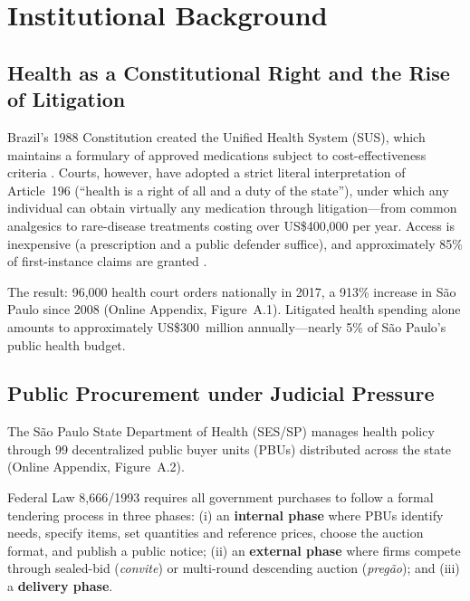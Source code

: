 \section{Institutional Background}
\label{sec:institutional}

\subsection{Health as a Constitutional Right and the Rise of Litigation}
\label{sec:health_right}

Brazil's 1988 Constitution created the Unified Health System (SUS), which maintains a formulary of approved medications subject to cost-effectiveness criteria \citep{castro2019, soares2019}. Courts, however, have adopted a strict literal interpretation of Article~196 (``health is a right of all and a duty of the state''), under which any individual can obtain virtually any medication through litigation---from common analgesics to rare-disease treatments costing over US\$400,000 per year. Access is inexpensive (a prescription and a public defender suffice), and approximately 85\% of first-instance claims are granted \citep{cnj2019judicializacao}.

The result: 96,000 health court orders nationally in 2017, a 913\% increase in S\~ao Paulo since 2008 (Online Appendix, Figure~A.1). Litigated health spending alone amounts to approximately US\$300~million annually---nearly 5\% of S\~ao Paulo's public health budget.

\subsection{Public Procurement under Judicial Pressure}
\label{sec:procurement_pressure}

The S\~ao Paulo State Department of Health (SES/SP) manages health policy through 99 decentralized public buyer units (PBUs) distributed across the state (Online Appendix, Figure~A.2).

Federal Law 8,666/1993 requires all government purchases to follow a formal tendering process in three phases: (i) an \textbf{internal phase} where PBUs identify needs, specify items, set quantities and reference prices, choose the auction format, and publish a public notice; (ii) an \textbf{external phase} where firms compete through sealed-bid (\textit{convite}) or multi-round descending auction (\textit{preg\~ao}); and (iii) a \textbf{delivery phase}.

